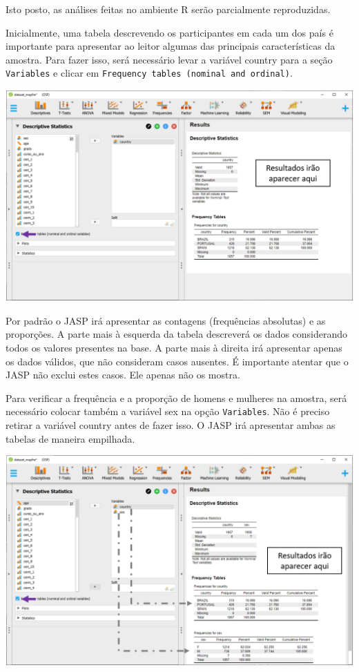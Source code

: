 \documentclass[
]{book}
\begin{document}
Isto posto, as análises feitas no ambiente R serão parcialmente reproduzidas.

Inicialmente, uma tabela descrevendo os participantes em cada um dos país é importante para apresentar ao leitor algumas das principais características da amostra. Para fazer isso, será necessário levar a variável country para a seção \texttt{Variables} e clicar em \texttt{Frequency\ tables\ (nominal\ and\ ordinal)}.

\includegraphics{./img/cap_desc_jasp_proporcao.png}

Por padrão o JASP irá apresentar as contagens (frequências absolutas) e as proporções. A parte mais à esquerda da tabela descreverá os dados considerando todos os valores presentes na base. A parte mais à direita irá apresentar apenas os dados válidos, que não consideram casos ausentes. É importante atentar que o JASP não exclui estes casos. Ele apenas não os mostra.

Para verificar a frequência e a proporção de homens e mulheres na amostra, será necessário colocar também a variável sex na opção \texttt{Variables}. Não é preciso retirar a variável country antes de fazer isso. O JASP irá apresentar ambas as tabelas de maneira empilhada.

\includegraphics{./img/cap_desc_jasp_proporcao_duas_variaveis.png}
\end{document}
